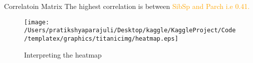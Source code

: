 \documentclass[
 size=14pt,
 paper=smartboard,  %
 mode=present, 		%
 display=slides, 	%
 style=tuliplab,  	%
 pauseslide,
 fleqn,leqno]{powerdot}
\begin{document}


\begin{slide}[toc=,bm=]{Correlatoin Matrix}
 The highest correlation is between \textcolor{orange}{SibSp and Parch i.e 0.41.}
  \begin{figure}
    \centering
    \centerline{\texttt{[image: /Users/pratikshyaparajuli/Desktop/kaggle/KaggleProject/Code/templatex/graphics/titanicimg/heatmap.eps]}}
    \caption{Interpreting the heatmap}\label{fig:Heat map}
  \end{figure}
  \end{slide}
  
  


\end{document}
